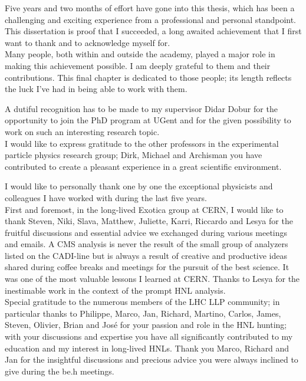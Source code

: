 \begin{acknowledgements}
{%
Five years and two months of effort have gone into this thesis, which has been a challenging and exciting experience from a professional and personal standpoint.
This dissertation is proof that I succeeded, a long awaited achievement that I first want to thank and to acknowledge myself for. \\
Many people, both within and outside the academy, played a major role in making this achievement possible. I am deeply grateful to them and their contributions. This final chapter is dedicated to those people; its length reflects the luck I've had in being able to work with them.

A dutiful recognition has to be made to my supervisor Didar Dobur for the opportunity to join the PhD program at UGent and for the given possibility to work on such an interesting research topic. \\
I would like to express gratitude to the other professors in the experimental particle physics research group; Dirk, Michael and Archisman you have contributed to create a pleasant experience in a great scientific environment. 

I would like to personally thank one by one the exceptional physicists and colleagues I have worked with during the last five years.\\
First and foremost, in the long-lived Exotica group at CERN, I would like to thank Steven, Niki, Slava, Matthew, Juliette, Karri, Riccardo and Lesya for the fruitful discussions and essential advice we exchanged during various meetings and emails. A CMS analysis is never the result of the small group of analyzers listed on the CADI-line but is always a result of creative and productive ideas shared during coffee breaks and meetings for the pursuit of the best science. It was one of the most valuable lessons I learned at CERN. Thanks to Lesya for the inestimable work in the context of the prompt HNL analysis.\\
Special gratitude to the numerous members of the LHC LLP community; in particular thanks to Philippe, Marco, Jan, Richard, Martino, Carlos, James, Steven, Olivier, Brian and Jos\'e for your passion and role in the HNL hunting; with your discussions and expertise you have all significantly contributed to my education and my interest in long-lived HNLs. Thank you Marco, Richard and Jan for the insightful discussions and precious advice you were always inclined to give during the be.h meetings.  \\

}
\end{acknowledgements}
